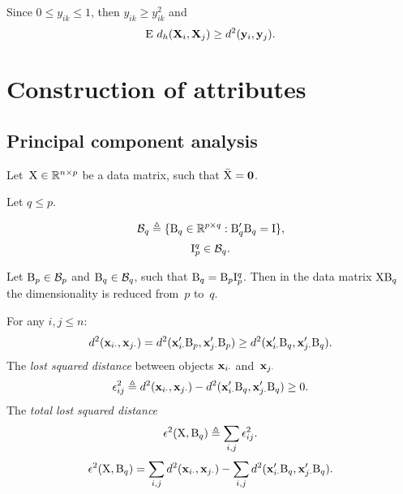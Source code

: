 \documentclass[10pt,a4paper]{article}
\theoremstyle{plain} \newtheorem{Lem}{Lemma}
\begin{document}
Since $0 \le y_{ik} \le 1$,
then $y_{ik} \ge y^2_{ik}$
and
$$ \mathrm E \  d_h (\mathbf X_i, \mathbf X_j) \ge d^2 (\mathbf y_i, \mathbf y_j). $$



\section{Construction of attributes}

\subsection{Principal component analysis}
Let~$\mathrm X \in \mathbb R^{n \times p}$ be a data matrix, such that $\bar {\mathrm X} = \mathbf 0$.

Let $q \le p$.

$$ \mathcal B_q \triangleq \{\mathrm B_q \in \mathbb R^{p \times q} : \mathrm B_q' \mathrm B_q = \mathrm I \}, $$
$$ \mathrm I^q_p \in \mathcal B_q. $$

Let $\mathrm B_p \in \mathcal B_p$ and $\mathrm B_q \in \mathcal B_q$, such that $\mathrm B_q = \mathrm B_p \mathrm I^q_p$.
Then in the data matrix $\mathrm X \mathrm B_q$ the dimensionality is reduced from~$p$ to~$q$.

For any $i,j \le n$:
$$ d^2(\mathbf x_{i\cdot}, \mathbf x_{j\cdot}) = d^2(\mathbf x_{i\cdot}' \mathrm B_p, \mathbf x_{j\cdot}' \mathrm B_p) \ge d^2(\mathbf x_{i\cdot}' \mathrm B_q, \mathbf x_{j\cdot}' \mathrm B_q). $$
The {\em lost squared distance} between objects $\mathbf x_{i\cdot}$ and~$\mathbf x_{j\cdot}$
$$ \epsilon^2_{ij} \triangleq d^2(\mathbf x_{i\cdot}, \mathbf x_{j\cdot}) - d^2(\mathbf x_{i\cdot}' \mathrm B_q, \mathbf x_{j\cdot}' \mathrm B_q) \ge 0. $$
The {\em total lost squared distance}
$$ \epsilon^2(\mathrm X, \mathrm B_q) \triangleq \sum_{i,j} \epsilon^2_{ij}. $$
$$ \epsilon^2(\mathrm X, \mathrm B_q) = \sum_{i,j} d^2(\mathbf x_{i\cdot}, \mathbf x_{j\cdot}) - \sum_{i,j} d^2(\mathbf x_{i\cdot}' \mathrm B_q, \mathbf x_{j\cdot}' \mathrm B_q). $$
\end{document}
